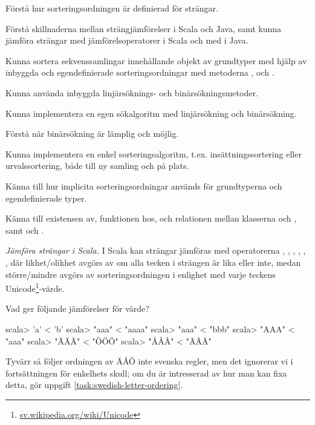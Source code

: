 

\Exercise{\ExeWeekTEN}\label{exe:W10}

\begin{Goals}
\item Förstå hur sorteringsordningen är definierad för strängar.
\item Förstå skillnaderna mellan strängjämförelser i Scala och Java, samt kunna jämföra strängar med jämförelsoperatorer i Scala och med  i Java.
\item Kunna sortera sekvenssamlingar innehållande objekt av grundtyper med hjälp av inbyggda och egendefinierade sorteringsordningar med metoderna ,  och .
\item Kunna använda inbyggda linjärsöknings- och binärsökningsmetoder. 
\item Kunna implementera en egen sökalgoritm med linjärsökning och binärsökning.
\item Förstå när binärsökning är lämplig och möjlig.
\item Kunna implementera en enkel sorteringsalgoritm, t.ex. insättningssortering eller urvalssortering, både till ny samling och på plats.   
\item Känna till hur implicita sorteringsordningar används för grundtyperna och egendefinierade typer.
\item Känna till existensen av, funktionen hos, och relationen mellan klasserna  och , samt   och .
\end{Goals}

\begin{Preparations}
\item {} 
\end{Preparations}

\BasicTasks %

\Task \label{task:string-order-operators}\emph{Jämföra strängar i Scala.} I Scala kan strängar jämföras med operatorerna \code{==}, \code{!=}, \code{<}, \code{<=}, \code{>}, \code{>=},  där likhet/olikhet avgörs av om alla tecken i strängen är lika eller inte, medan större/mindre avgörs av sorteringsordningen i enlighet med varje teckens Unicode\footnote{\href{https://sv.wikipedia.org/wiki/Unicode}{sv.wikipedia.org/wiki/Unicode}}-värde. 

\Subtask Vad ger följande jämförelser för värde?
\begin{REPL}
scala> 'a' < 'b'
scala> "aaa" < "aaaa"
scala> "aaa" < "bbb"
scala> "AAA" < "aaa"
scala> "ÄÄÄ" < "ÖÖÖ"
scala> "ÅÅÅ" < "ÄÄÄ"
\end{REPL}
Tyvärr så följer ordningen av ÄÅÖ inte svenska regler, men det ignorerar vi i fortsättningen för enkelhets skull; om du är intresserad av hur man kan fixa  detta, gör uppgift \ref{task:swedish-letter-ordering}. 

